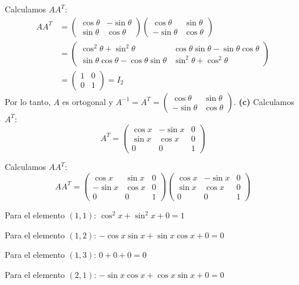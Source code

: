 \begin{myproof}
Calculamos $AA^T$:
\begin{align*}
AA^T &= \begin{pmatrix} \cos\theta & -\sin\theta\\\sin\theta&\cos\theta \end{pmatrix} \begin{pmatrix} \cos\theta & \sin\theta\\-\sin\theta&\cos\theta \end{pmatrix}\\&= \begin{pmatrix} \cos^2\theta + \sin^2\theta & \cos\theta\sin\theta - \sin\theta\cos\theta\\\sin\theta\cos\theta - \cos\theta\sin\theta & \sin^2\theta + \cos^2\theta \end{pmatrix}\\&= \begin{pmatrix} 1 & 0\\0 & 1 \end{pmatrix} = I_2
\end{align*}
Por lo tanto, $A$ es ortogonal y $A^{-1} = A^T = \begin{pmatrix} \cos\theta & \sin\theta\\-\sin\theta&\cos\theta \end{pmatrix}$.
\textbf{(c)} Calculamos $A^T$:
$$A^T = \left(\begin{array}{ccc}\cos x & -\sin x & 0 \\\sin x & \cos x & 0 \\0 & 0 & 1\end{array}\right)$$

Calculamos $AA^T$:
$$AA^T = \left(\begin{array}{ccc}\cos x & \sin x & 0 \\-\sin x & \cos x & 0 \\0 & 0 & 1\end{array}\right) \left(\begin{array}{ccc}\cos x & -\sin x & 0 \\\sin x & \cos x & 0 \\0 & 0 & 1\end{array}\right)$$

Para el elemento $(1,1)$: $\cos^2 x + \sin^2 x + 0 = 1$

Para el elemento $(1,2)$: $-\cos x \sin x + \sin x \cos x + 0 = 0$

Para el elemento $(1,3)$: $0 + 0 + 0 = 0$

Para el elemento $(2,1)$: $-\sin x \cos x + \cos x \sin x + 0 = 0$


\end{myproof}

